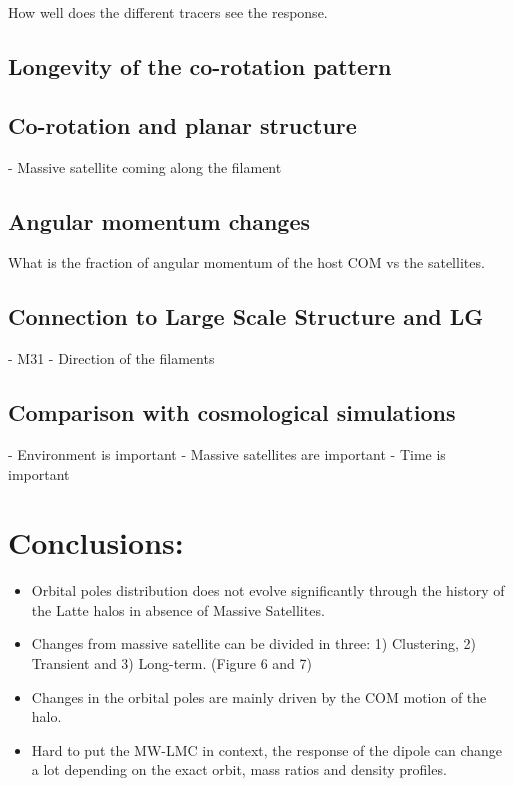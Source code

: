 \documentclass{aastex63}
\begin{document}
How well does the different tracers see the response. 

\subsection{Longevity of the co-rotation pattern}

\subsection{Co-rotation and planar structure}

- Massive satellite coming along the filament

\subsection{Angular momentum changes}

What is the fraction of angular momentum of the host COM vs the satellites. 

\subsection{Connection to Large Scale Structure and LG}

- M31
- Direction of the filaments


\subsection{Comparison with cosmological simulations}

- Environment is important
- Massive satellites are important
- Time is important

\section*{Conclusions:}

\begin{itemize}
    \item Orbital poles distribution does not evolve significantly through the history of the Latte halos in absence of Massive Satellites.
    \item Changes from massive satellite can be divided in three: 1) Clustering, 2) Transient and 3) Long-term. (Figure 6 and 7)
    \item Changes in the orbital poles are mainly driven by the COM motion of the halo.
    \item Hard to put the MW-LMC in context, the response of the dipole can change a lot depending on the exact orbit, mass ratios and density profiles. 
    
\end{itemize}
\end{document}
